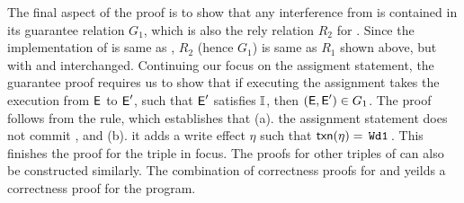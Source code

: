The final aspect of the proof is to show that any interference from
 is contained in its guarantee relation $G_1$, which is also
the rely relation $R_2$ for . Since the implementation of
 is same as , $R_2$ (hence $G_1$) is same as $R_1$ shown
above, but with  and  interchanged. Continuing our focus
on the assigment statement, the guarantee proof requires us to show
that if executing the assignment takes the execution from $\textsf{E}$ to
$\textsf{E}'$, such that $\textsf{E}'$ satisfies $\mathbb{I}$, then $(\textsf{E},\textsf{E}') \in G_1$.  The
proof follows from the  rule, which establishes
that (a). the assignment statement does not commit , and (b).
it adds a write effect $\eta$ such that $\textsf{txn}(\eta)=\,{\tt Wd1}\,$. This
finishes the proof for the triple in focus. The proofs for other
triples of  can also be constructed similarly. The combination
of correctness proofs for  and  yeilds a correctness
proof for the program.
